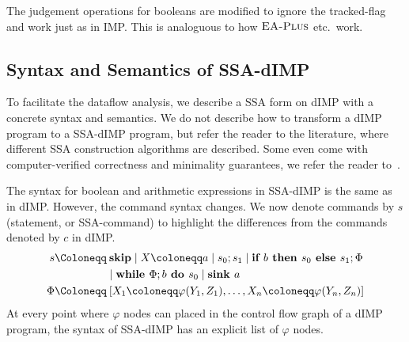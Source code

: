 The judgement operations for booleans are modified to ignore the tracked-flag and work
just as in IMP. This is analoguous to how $\textsc{EA-Plus}$ etc.\ work.

\subsection{Syntax and Semantics of SSA-dIMP}
To facilitate the dataflow analysis, we describe a SSA form on dIMP with a concrete
syntax and semantics.
We do not describe how to transform a dIMP program to a SSA-dIMP program, but 
refer the reader to the literature, where different SSA construction algorithms are
described. Some even come with computer-verified correctness and minimality guarantees,
we refer the reader to~\cite{verifiedssa}.

The syntax for boolean and arithmetic expressions in SSA-dIMP is the same as in dIMP.
However, the command syntax changes.
We now denote commands by $s$ (statement, or SSA-command) to highlight the differences
from the commands denoted by $c$ in dIMP.
\begin{align*}
    s \Coloneqq &\:\skipcmd \mid \defaultstore \mid \defaultssaseq \mid \defaultssaif\\
    &\mid \defaultssawhile  \mid \defaultsink \\
    \philist \Coloneqq &\: \defaultphilistn\\
\end{align*}
At every point where $\varphi$ nodes can placed in the control flow graph
of a dIMP program, the syntax of SSA-dIMP has an explicit list of $\varphi$ nodes.

